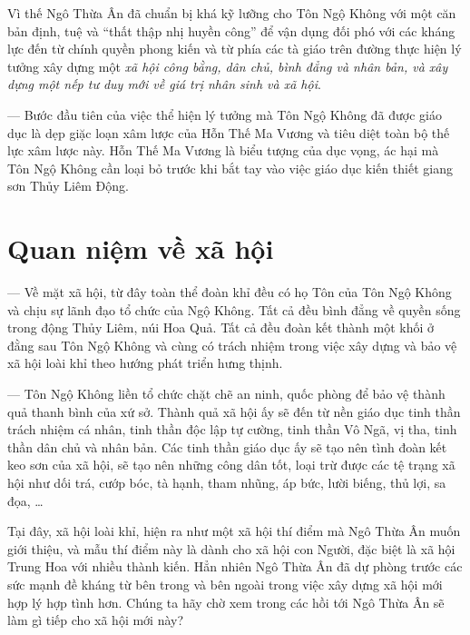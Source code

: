 Vì thế Ngô Thừa Ân đã chuẩn bị khá kỹ lưỡng cho Tôn Ngộ Không với một căn bản định, tuệ và ``thất thập nhị huyền công'' để vận dụng đối phó với các kháng lực đến từ chính quyền phong kiến và từ phía các tà giáo trên đường thực hiện lý tưởng xây dựng một \emph{xã hội công bằng, dân chủ, bình đẳng và nhân bản, và xây dựng một nếp tư duy mới về giá trị nhân sinh và xã hội}.

— Bước đầu tiên của việc thể hiện lý tưởng mà Tôn Ngộ Không đã được giáo dục là dẹp giặc loạn xâm lược của Hỗn Thế Ma Vương và tiêu diệt toàn bộ thế lực xâm lược này. Hỗn Thế Ma Vương là biểu tượng của dục vọng, ác hại mà Tôn Ngộ Không cần loại bỏ trước khi bắt tay vào việc giáo dục kiến thiết giang sơn Thủy Liêm Động.


\section{Quan niệm về xã hội} %
\label{sec:2_quan_niem_ve_xa_hoi}

— Về mặt xã hội, từ đây toàn thể đoàn khỉ đều có họ Tôn của Tôn Ngộ Không và chịu sự lãnh đạo tổ chức của Ngộ Không. Tất cả đều bình đẳng về quyền sống trong động Thủy Liêm, núi Hoa Quả. Tất cả đều đoàn kết thành một khối ở đằng sau Tôn Ngộ Không và cùng có trách nhiệm trong việc xây dựng và bảo vệ xã hội loài khỉ theo hướng phát triển hưng thịnh.

— Tôn Ngộ Không liền tổ chức chặt chẽ an ninh, quốc phòng để bảo vệ thành quả thanh bình của xứ sở. Thành quả xã hội ấy sẽ đến từ nền giáo dục tinh thần trách nhiệm cá nhân, tinh thần độc lập tự cường, tinh thần Vô Ngã, vị tha, tinh thần dân chủ và nhân bản. Các tinh thần giáo dục ấy sẽ tạo nên tình đoàn kết keo sơn của xã hội, sẽ tạo nên những công dân tốt, loại trừ được các tệ trạng xã hội như dối trá, cướp bóc, tà hạnh, tham nhũng, áp bức, lười biếng, thủ lợi, sa đọa, \ldots

Tại đây, xã hội loài khỉ, hiện ra như một xã hội thí điểm mà Ngô Thừa Ân muốn giới thiệu, và mẫu thí điểm này là dành cho xã hội con Người, đặc biệt là xã hội Trung Hoa với nhiều thành kiến. Hẳn nhiên Ngô Thừa Ân đã dự phòng trước các sức mạnh đề kháng từ bên trong và bên ngoài trong việc xây dựng xã hội mới hợp lý hợp tình hơn. Chúng ta hãy chờ xem trong các hồi tới Ngô Thừa Ân sẽ làm gì tiếp cho xã hội mới này?
